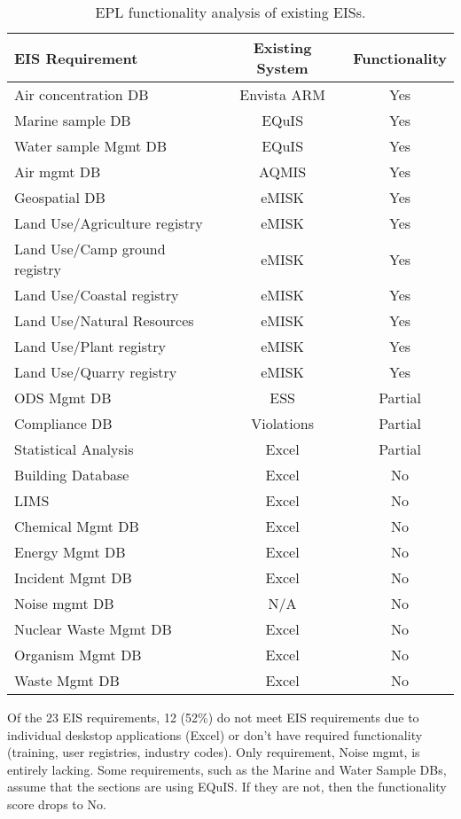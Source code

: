 \begin{table}[H]
\centering
\caption{EPL functionality analysis of existing EISs.}
\label{tab:eplfunc}
\begin{tabular}{@{}lcc@{}}
\toprule
\textbf{EIS Requirement} & \textbf{Existing System} & \textbf{Functionality} \\ \midrule
Air concentration DB & Envista ARM & Yes \\
Marine sample DB & EQuIS & Yes \\
Water sample Mgmt DB & EQuIS & Yes \\
Air mgmt DB & AQMIS & Yes \\
Geospatial DB & eMISK & Yes \\
Land Use/Agriculture registry & eMISK & Yes \\
Land Use/Camp ground registry & eMISK & Yes \\
Land Use/Coastal registry & eMISK & Yes \\
Land Use/Natural Resources & eMISK & Yes \\
Land Use/Plant registry & eMISK & Yes \\
Land Use/Quarry registry & eMISK & Yes \\
ODS Mgmt DB & ESS & Partial \\
Compliance DB & Violations & Partial \\
Statistical Analysis & Excel & Partial \\
Building Database & Excel & No \\
LIMS & Excel & No \\
Chemical Mgmt DB & Excel & No \\
Energy Mgmt DB & Excel & No \\
Incident Mgmt DB & Excel & No \\
Noise mgmt DB & N/A & No \\
Nuclear Waste Mgmt DB & Excel & No \\
Organism Mgmt DB & Excel & No \\
Waste Mgmt DB & Excel & No \\ \bottomrule
\end{tabular}
\end{table}

Of the 23 EIS  requirements, 12 (52\%) do not meet EIS requirements due to individual deskstop applications (Excel) or don't have required functionality (training, user registries, industry codes). Only requirement, Noise mgmt, is entirely lacking. Some requirements, such as the Marine and Water Sample DBs, assume that the sections are using EQuIS. If they are not, then the functionality score drops to No.

